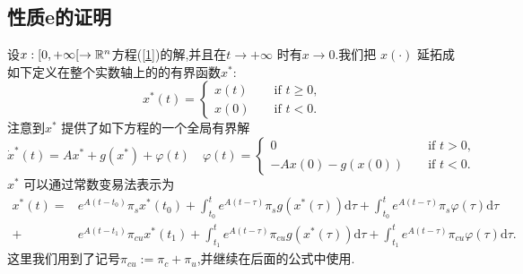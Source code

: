 \subsection{性质e的证明}
设$x:[0,+\infty[\to \mathbb{R}^{n}$方程(\ref{1})的解,并且在$t\to +\infty$ 时有$x\to 0$.我们把 $x(\cdot )$ 延拓成如下定义在整个实数轴上的的有界函数$x^{\ast}$:
\begin{equation*}
  x^{*}(t)=\left\{\begin{aligned}
      x(t) & & \text{ if } t\ge 0,\\
      x(0) & & \text{ if } t<0.
    \end{aligned}\right.
\end{equation*}
注意到$x^{\ast}$ 提供了如下方程的一个全局有界解
\begin{equation*}
  \dot{x}^{\ast}(t)=Ax^{\ast}+g(x^{\ast})+\varphi(t)\quad \varphi(t)=\left\{
    \begin{aligned}
    0 & & \text{ if }t>0,\\
    -Ax(0)-g(x(0)) & & \text{ if }t<0.
  \end{aligned}
  \right.
\end{equation*}
$x^{\ast}$ 可以通过常数变易法表示为
\begin{equation}
  \begin{aligned}
    x^{\ast}(t) = & e^{A(t-t_0)}\pi_s x^{\ast}(t_0)+\int_{t_0}^{t}e^{A(t-\tau)}\pi_sg(x^{\ast}(\tau))\mathrm{d}\tau+\int_{t_0}^{t}e^{A(t-\tau)}\pi_s\varphi(\tau)\mathrm{d}\tau\\
    + & e^{A(t-t_1)}\pi_{cu}x^{\ast}(t_1)+\int_{t_1}^{t}e^{A(t-\tau)}\pi_{cu}g(x^{\ast}(\tau))\mathrm{d}\tau+\int_{t_1}^{t}e^{A(t-\tau)}\pi_{cu}\varphi(\tau)\mathrm{d}\tau.
  \end{aligned}\label{311}
\end{equation}
这里我们用到了记号$\pi_{cu}:=\pi_c+\pi_u$,并继续在后面的公式中使用.

